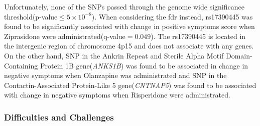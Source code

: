 	Unfortunately, none of the \glspl{SNP} passed through the genome wide significance threshold(p-value$\le5\times10^{-8}$).
	When considering the \gls{fdr} instead, rs17390445 was found to be significantly associated with change in positive symptoms score when Ziprasidone were administrated(q-value$=0.049$).
	The rs17390445 is located in the intergenic region of chromosome 4p15 and does not associate with any genes. 
	On the other hand, \gls{SNP} in the Ankrin Repeat and Sterile Alpha Motif Domain-Containing Protein 1B gene(\textit{ANKS1B}) was found to be associated in change in negative symptoms when Olanzapine was administrated and \gls{SNP} in the Contactin-Associated Protein-Like 5 gene(\textit{CNTNAP5}) was found to be associated with change in negative symptoms when Risperidone were administrated.
	
	
	\subsubsection{Difficulties and Challenges}
	
	